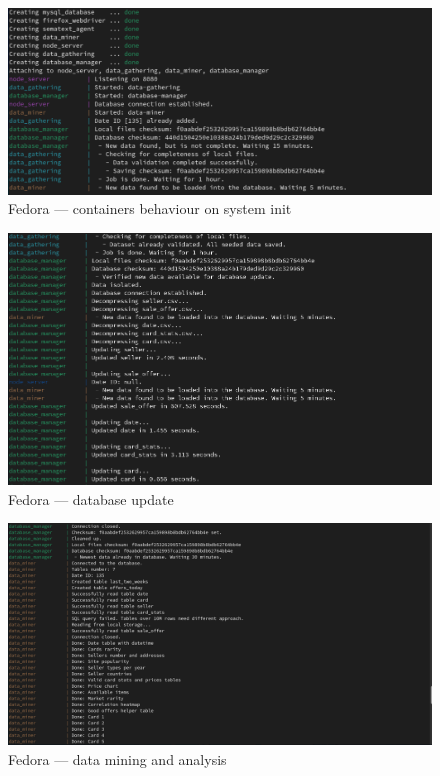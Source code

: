 \begin{figure}
    \centering
    \includegraphics[width=\textwidth]{figures/fedora_init.png}
    \caption{Fedora --- containers behaviour on system init}
    \label{fig:fedora_init}
\end{figure}

\begin{figure}
    \centering
    \includegraphics[width=\textwidth]{figures/fedora_db_update.png}
    \caption{Fedora --- database update}
    \label{fig:fedora_db_update}
\end{figure}

\begin{figure}
    \centering
    \includegraphics[width=\textwidth]{figures/fedora_miner.png}
    \caption{Fedora --- data mining and analysis}
    \label{fig:fedora_miner}
\end{figure}

